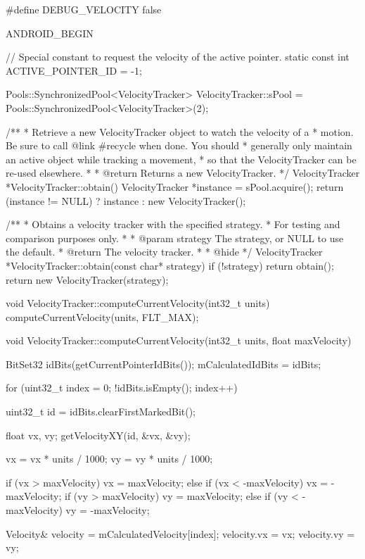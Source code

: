 #define DEBUG_VELOCITY false

ANDROID_BEGIN

// Special constant to request the velocity of the active pointer.
static const int ACTIVE_POINTER_ID = -1;

Pools::SynchronizedPool<VelocityTracker> VelocityTracker::sPool = Pools::SynchronizedPool<VelocityTracker>(2);

/**
 * Retrieve a new VelocityTracker object to watch the velocity of a
 * motion.  Be sure to call {@link #recycle} when done.  You should
 * generally only maintain an active object while tracking a movement,
 * so that the VelocityTracker can be re-used elsewhere.
 *
 * @return Returns a new VelocityTracker.
 */
VelocityTracker *VelocityTracker::obtain() {
    VelocityTracker *instance = sPool.acquire();
    return (instance != NULL) ? instance : new VelocityTracker();
}

/**
 * Obtains a velocity tracker with the specified strategy.
 * For testing and comparison purposes only.
 *
 * @param strategy The strategy, or NULL to use the default.
 * @return The velocity tracker.
 *
 * @hide
 */
VelocityTracker *VelocityTracker::obtain(const char* strategy) {
    if (!strategy) {
        return obtain();
    }
    return new VelocityTracker(strategy);
}

void VelocityTracker::computeCurrentVelocity(int32_t units) {
    computeCurrentVelocity(units, FLT_MAX);
}

void VelocityTracker::computeCurrentVelocity(int32_t units, float maxVelocity) {
    
    BitSet32 idBits(getCurrentPointerIdBits());
    mCalculatedIdBits = idBits;
    
    for (uint32_t index = 0; !idBits.isEmpty(); index++) {
        uint32_t id = idBits.clearFirstMarkedBit();
        
        float vx, vy;
        getVelocityXY(id, &vx, &vy);
        
        vx = vx * units / 1000;
        vy = vy * units / 1000;
        
        if (vx > maxVelocity) {
            vx = maxVelocity;
        } else if (vx < -maxVelocity) {
            vx = -maxVelocity;
        }
        if (vy > maxVelocity) {
            vy = maxVelocity;
        } else if (vy < -maxVelocity) {
            vy = -maxVelocity;
        }
        
        Velocity& velocity = mCalculatedVelocity[index];
        velocity.vx = vx;
        velocity.vy = vy;
    }
}

